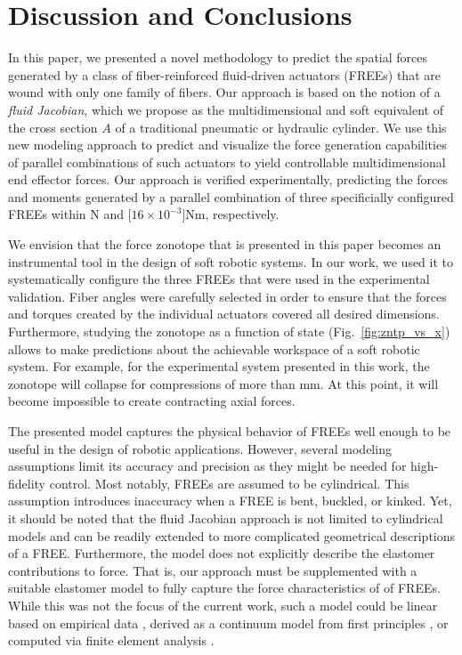 \section{Discussion and Conclusions}
\label{sec:conclusion}
In this paper, we presented a novel methodology to predict the spatial forces generated by a class of fiber-reinforced fluid-driven actuators (FREEs) that are wound with only one family of fibers.
Our approach is based on the notion of a \emph{fluid Jacobian}, which we propose as the multidimensional and soft equivalent of the cross section $A$ of a traditional pneumatic or hydraulic cylinder.
We use this new modeling approach to predict and visualize the force generation capabilities of parallel combinations of such actuators to yield controllable multidimensional end effector forces.
Our approach is verified experimentally, predicting the forces and moments generated by a parallel combination of three specificially configured FREEs within \unit[3]{N} and \unit[$16 \times 10^{-3}$]{Nm}, respectively.

We envision that the force zonotope that is presented in this paper becomes an instrumental tool in the design of soft robotic systems.
In our work, we used it to systematically configure the three FREEs that were used in the experimental validation.
Fiber angles were carefully selected in order to ensure that the forces and torques created by the individual actuators covered all desired dimensions.
Furthermore, studying the zonotope as a function of state (Fig.~\ref{fig:zntp_vs_x}) allows to make predictions about the achievable workspace of a soft robotic system.
For example, for the experimental system presented in this work, the zonotope will collapse for compressions of more than \unit[-10]{mm}.
At this point, it will become impossible to create contracting axial forces.

The presented model captures the physical behavior of FREEs well enough to be useful in the design of robotic applications.
However, several modeling assumptions limit its accuracy and precision as they might be needed for high-fidelity control. 
Most notably, FREEs are assumed to be cylindrical. 
This assumption introduces inaccuracy when a FREE is bent, buckled, or kinked. 
Yet, it should be noted that the fluid Jacobian approach is not limited to cylindrical models and can be readily extended to more complicated geometrical descriptions of a FREE.
Furthermore, the model does not explicitly describe the elastomer contributions to force.
That is, our approach must be supplemented with a suitable elastomer model to fully capture the force characteristics of of FREEs.
While this was not the focus of the current work, such a model could be linear based on empirical data \cite{bruder2017model}, derived as a continuum model from first principles \cite{sedal2017constitutive}, or computed via finite element analysis \cite{connolly2015mechanical}.


